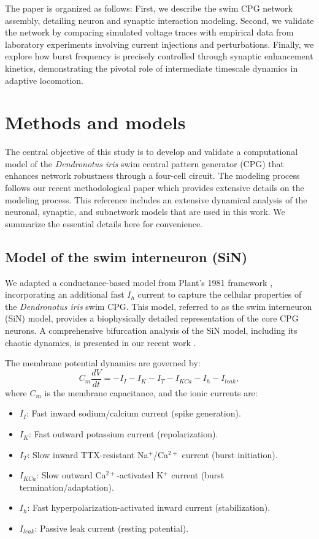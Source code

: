 \documentclass[nofootinbib,aip,amsmath,amssymb,reprint,twocolumn,10pt]{revtex4-2}
\begin{document}
The paper is organized as follows: First, we describe the swim CPG network assembly, detailing neuron and synaptic interaction modeling.
Second, we validate the network by comparing simulated voltage traces with empirical data from laboratory experiments involving current injections and perturbations.
Finally, we explore how burst frequency is precisely controlled through synaptic enhancement kinetics, demonstrating the pivotal role of intermediate timescale dynamics in adaptive locomotion.

\section{Methods and models}

The central objective of this study is to develop and validate a computational model of the \textit{Dendronotus iris} swim central pattern generator (CPG) that enhances network robustness through a four-cell circuit.
The modeling process follows our recent methodological paper \cite{scully2024pairing} which provides extensive details on the modeling process.
This reference includes an extensive dynamical analysis of the neuronal, synaptic, and subnetwork models that are used in this work. 
We summarize the essential details here for convenience.

\subsection{Model of the swim interneuron (SiN)}

We adapted a conductance-based model from Plant's 1981 framework \cite{plant81, scully2024pairing}, incorporating an additional fast $I_h$ current to capture the cellular properties of the \textit{Dendronotus iris} swim CPG. This model, referred to as the swim interneuron (SiN) model, provides a biophysically detailed representation of the core CPG neurons. A comprehensive bifurcation analysis of the SiN model, including its chaotic dynamics, is presented in our recent work \cite{scully2024chaos}.

The membrane potential dynamics are governed by:
\begin{equation}
C_m \frac{dV}{dt} = -I_{I} - I_K - I_{T} - I_{KCa} - I_h - I_{leak},
\end{equation}
where $C_m$ is the membrane capacitance, and the ionic currents are:
\begin{itemize}
  \item $I_{I}$: Fast inward sodium/calcium current (spike generation).
  \item $I_K$: Fast outward potassium current (repolarization).
  \item $I_{T}$: Slow inward TTX-resistant Na$^+$/Ca$^{2+}$ current (burst initiation).
  \item $I_{KCa}$: Slow outward Ca$^{2+}$-activated K$^+$ current (burst termination/adaptation).
  \item $I_h$: Fast hyperpolarization-activated inward current (stabilization).
  \item $I_{leak}$: Passive leak current (resting potential).
\end{itemize}
\end{document}
